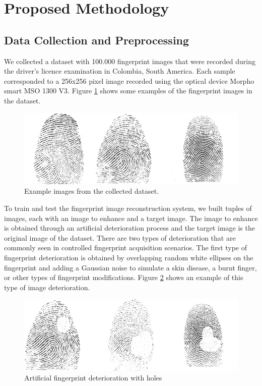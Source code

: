 \documentclass[a4paper,fleqn]{cas-dc}
\begin{document}
     
     
\section{Proposed Methodology}
\label{sec:PM}

\subsection{Data Collection and Preprocessing}
\label{sec:DP}
We collected a dataset with 100.000 fingerprint images that were recorded during the driver's licence examination in Colombia, South America. Each sample corresponded to a 256x256 pixel image recorded using the optical device Morpho smart MSO 1300 V3. Figure \ref{fig1} shows some examples of the fingerprint images in the dataset.
\begin{figure}[ht]
\centerline{\includegraphics[scale=0.3]{figs/dataset_example.png}}
\caption{Example images from the collected dataset.}
\label{fig1}
\end{figure}
To train and test the fingerprint image reconstruction system, we built tuples of images, each with an image to enhance and a target image. The image to enhance is obtained through an artificial deterioration process and the target image is the original image of the dataset. There are two types of deterioration that are commonly seen in controlled fingerprint acquisition scenarios. The first type of fingerprint deterioration is obtained by overlapping random white ellipses on the fingerprint and adding a Gaussian noise to simulate a skin disease, a burnt finger, or other types of fingerprint modifications. Figure \ref{fig2} shows an example of this type of image deterioration.
\begin{figure}[htbp]
\centerline{\includegraphics[scale=0.3]{figs/deterioration_1.png}}
\caption{Artificial fingerprint deterioration with holes}
\label{fig2}
\end{figure}
\end{document}

